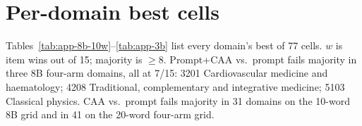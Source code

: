 \documentclass{article} %
\begin{document}
\section{Per-domain best cells}

Tables~\ref{tab:app-8b-10w}--\ref{tab:app-3b} list every domain's best of 77 cells.
$w$ is item wins out of 15; majority is $\geq 8$.
Prompt+CAA vs.\ prompt fails majority in three 8B four-arm domains, all at 7/15: 3201 Cardiovascular medicine and haematology; 4208 Traditional, complementary and integrative medicine; 5103 Classical physics.
CAA vs.\ prompt fails majority in 31 domains on the 10-word 8B grid and in 41 on the 20-word four-arm grid.


\end{document}
